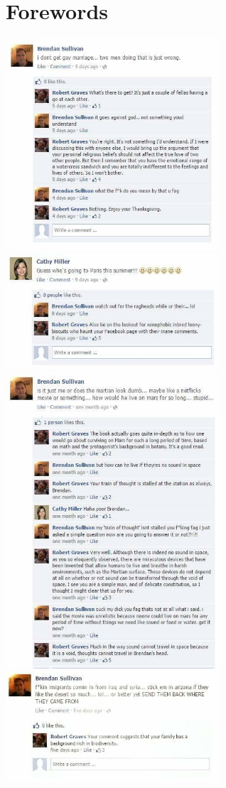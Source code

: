 \documentclass{42-en}
\begin{document}
\chapter{Forewords}
	\includegraphics[width=8cm]{bren1.jpg}
	\includegraphics[width=8cm]{bren2.jpg}
	\includegraphics[width=8cm]{bren3.jpg}
	\includegraphics[width=8cm]{bren4.jpg}
\end{document}
